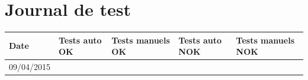 \documentclass{../res/univ-projet}
\begin{document}
\section{Journal de test}

\begin{center}
    \begin{tabular}{|p{2cm}|p{3.1cm}|p{3.1cm}|p{3.1cm}|p{3.1cm}|}
      \hline
      Date & Tests auto OK & Tests manuels OK & Tests auto NOK & Tests manuels NOK\\ \hline
      09/04/2015 &  &  &  &\\ \hline

  \end{tabular}  
\end{center}
\end{document}
